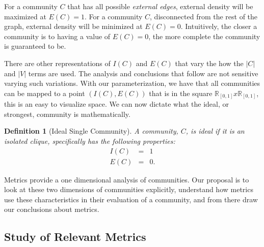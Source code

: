 \documentclass[phd,tocprelim]{cornell}
\newtheorem{definition}{Definition}
\begin{document}
For a community $C$ that has all possible {\it external edges}, external density will be maximized at $E(C)=1$.  For a community $C$, disconnected from the rest of the graph, external density will be minimized at $E(C) = 0$.  Intuitively, the closer a community is to having a value of $E(C) = 0$, the more complete the community is guaranteed to be.

There are other representations of $I(C)$ and $E(C)$ that vary the how the $|C|$ and $|V|$ terms are used.  The analysis and conclusions that follow are not sensitive varying such variations.  With our parameterization, we have that all communities can be mapped to a point $(I(C), E(C))$ that is in the square $\mathbb{R}_{[0, 1]} x \mathbb{R}_{[0, 1]}$, this is an easy to visualize space.  We can now dictate what the ideal, or strongest, community is mathematically.
\begin{definition}[Ideal Single Community]
A community, $C$, is ideal if it is an isolated clique, specifically has the following properties:
\begin{eqnarray*}
I(C) &=& 1\\
E(C) &=& 0.
\end{eqnarray*}
\end{definition}

Metrics provide a one dimensional analysis of communities. Our proposal is to look at these two dimensions of communities explicitly, understand how metrics use these characteristics in their evaluation of a community, and from there draw our conclusions about metrics. 


\subsection{Study of Relevant Metrics}
\end{document}
